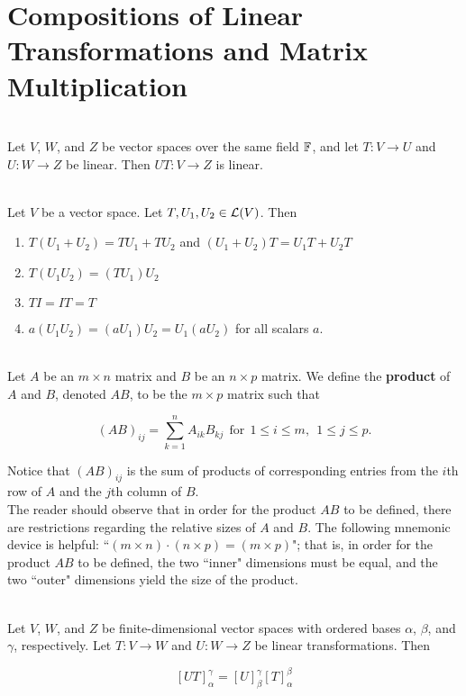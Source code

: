 \section{Compositions of Linear Transformations and Matrix Multiplication}

\begin{theorem}
	\hfill\\
	Let $V$, $W$, and $Z$ be vector spaces over the same field $\mathbb{F}$, and let $T: V \to U$ and $U: W \to Z$ be linear. Then $UT: V \to Z$ is linear.
\end{theorem}

\begin{theorem}
	\hfill\\
	Let $V$ be a vector space. Let $T, U_1, U_2 \in \mathcal{L}(V)$. Then

	\begin{enumerate}
		\item $T(U_1 + U_2) = TU_1 + TU_2$ and $(U_1 + U_2)T = U_1T + U_2T$
		\item $T(U_1U_2) = (TU_1)U_2$
		\item $TI = IT = T$
		\item $a(U_1U_2) = (aU_1)U_2 = U_1(aU_2)$ for all scalars $a$.
	\end{enumerate}
\end{theorem}

\begin{definition}
	\hfill\\
	Let $A$ be an $m \times n$ matrix and $B$ be an $n \times p$ matrix. We define the \textbf{product} of $A$ and $B$, denoted $AB$, to be the $m \times p$ matrix such that

	\[(AB)_{ij} = \sum_{k=1}^{n}A_{ik}B_{kj}\ \ \text{for}\ \ 1 \leq i \leq m,\ \ 1 \leq j \leq p.\]

	Notice that $(AB)_{ij}$ is the sum of products of corresponding entries from the $i$th row of $A$ and the $j$th column of $B$.\\

	The reader should observe that in order for the product $AB$ to be defined, there are restrictions regarding the relative sizes of $A$ and $B$. The following mnemonic device is helpful: ``$(m \times n) \cdot (n \times p) = (m \times p)$"; that is, in order for the product $AB$ to be defined, the two ``inner" dimensions must be equal, and the two ``outer" dimensions yield the size of the product.
\end{definition}

\begin{theorem}
	\hfill\\
	Let $V$, $W$, and $Z$ be finite-dimensional vector spaces with ordered bases $\alpha$, $\beta$, and $\gamma$, respectively. Let $T: V \to W$ and $U: W \to Z$ be linear transformations. Then

	\[[UT]_\alpha^\gamma = [U]_\beta^\gamma[T]_\alpha^\beta\]
\end{theorem}

